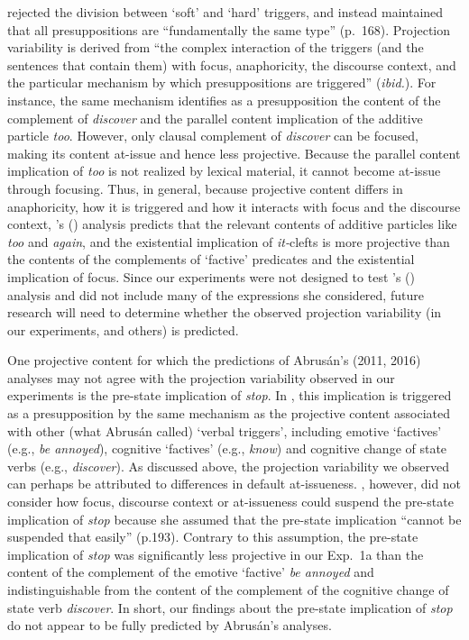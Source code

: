 \documentclass[11pt,fleqn]{article}
\newcommand{\6}{\mbox{$[\hspace*{-.6mm}[$}}
\newcommand{\9}{\mbox{$]\hspace*{-.6mm}]$}}
\newcommand{\citetpos}[1]{\citeauthor{#1}'s (\citeyear{#1})}
\begin{document}
\citet{abrusan2016} rejected the division between `soft' and `hard' triggers, and instead maintained that all presuppositions are ``fundamentally the same type'' (p.\ 168). Projection variability is derived from ``the complex interaction of the triggers (and the sentences that contain them) with focus, anaphoricity, the discourse context, and the particular mechanism by which presuppositions are triggered'' ({\em ibid.}). For instance, the same mechanism identifies as a presupposition the content of the complement of {\em discover} and the parallel content implication of the additive particle {\em too}. However, only clausal complement of {\em discover} can be focused, making its content at-issue and hence less projective. Because the parallel content implication of {\em too} is not realized by lexical material, it cannot become at-issue through focusing. Thus, in general, because projective content differs in anaphoricity, how it is triggered and how it interacts with focus and the discourse context, \citetpos{abrusan2016} analysis predicts that the relevant contents of additive particles like {\em too} and {\em again}, and the existential implication of {\em it-}clefts is more projective than the contents of the complements of `factive' predicates and the existential implication of focus. Since our experiments were not designed to test \citetpos{abrusan2016} analysis and did not include many of the expressions she considered, future research will need to determine whether the observed projection variability (in our experiments, and others) is predicted.

One projective content for which the predictions of Abrus\'an's (2011, 2016) analyses may not agree with the projection variability observed in our experiments is the pre-state implication of {\em stop}. In \citealt{abrusan2011}, this implication is triggered as a presupposition by the same mechanism as the projective content associated with other (what Abrus\'an called) `verbal triggers', including emotive `factives' (e.g., {\em be annoyed}), cognitive `factives' (e.g., {\em know}) and cognitive change of state verbs (e.g., {\em discover}). As discussed above, the projection variability we observed can perhaps be attributed to differences in default at-issueness.  \citet{abrusan2016}, however, did not consider how focus, discourse context or at-issueness could suspend the pre-state implication of {\em stop} because she assumed that the pre-state implication ``cannot be suspended that easily'' (p.193). Contrary to this assumption, the pre-state implication of {\em stop} was significantly less projective in our Exp.~1a than the content of the complement of the emotive `factive' {\em be annoyed} and indistinguishable from the content of the complement of the cognitive change of state verb {\em discover}. In short, our findings about the pre-state implication of {\em stop} do not appear to be fully predicted by Abrus\'an's analyses. 
\end{document}
